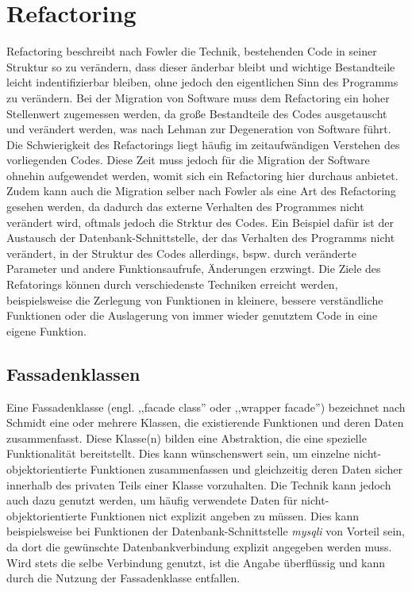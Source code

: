 \section{Refactoring} %
    Refactoring beschreibt nach Fowler die Technik, bestehenden Code in seiner Struktur so zu verändern, dass dieser änderbar bleibt und wichtige Bestandteile leicht indentifizierbar 
    bleiben, ohne jedoch den eigentlichen Sinn des Programms zu verändern. \cite{fowler_refactoring_1999} Bei der Migration von Software muss dem Refactoring ein hoher Stellenwert zugemessen werden, 
    da große Bestandteile des Codes ausgetauscht und verändert werden, was nach Lehman \cite[S. 1060-1076]{lehman_programs_1980} zur Degeneration von Software führt.
    Die Schwierigkeit des Refactorings liegt häufig im zeitaufwändigen Verstehen des vorliegenden Codes. Diese Zeit muss jedoch für die Migration der Software ohnehin 
    aufgewendet werden, womit sich ein Refactoring hier durchaus anbietet. Zudem kann auch die Migration selber nach Fowler als eine 
    Art des Refactoring gesehen werden, da dadurch das externe Verhalten des Programmes nicht verändert wird, oftmals jedoch 
    die Strktur des Codes. Ein Beispiel dafür ist der Austausch der Datenbank-Schnittstelle, der das Verhalten des Programms 
    nicht verändert, in der Struktur des Codes allerdings, bspw. durch veränderte Parameter und andere Funktionsaufrufe, 
    Änderungen erzwingt.
    Die Ziele des Refatorings können durch verschiedenste Techniken erreicht werden, beispielsweise die Zerlegung von Funktionen in kleinere, bessere verständliche 
    Funktionen oder die Auslagerung von immer wieder genutztem Code in eine eigene Funktion.
    \subsection{Fassadenklassen}\label{facade}
    Eine Fassadenklasse (engl. ,,facade class'' oder ,,wrapper facade'') bezeichnet nach Schmidt eine oder mehrere Klassen, die 
    existierende Funktionen und deren Daten zusammenfasst. Diese Klasse(n) bilden eine Abstraktion, die eine spezielle 
    Funktionalität bereitstellt. \cite[S. 54]{schmidt_pattern-oriented_2000} 
    Dies kann wünschenswert sein, um einzelne nicht-objektorientierte Funktionen zusammenfassen und gleichzeitig deren Daten 
    sicher innerhalb des privaten Teils einer Klasse vorzuhalten. Die Technik kann jedoch auch dazu genutzt werden, um häufig 
    verwendete Daten für nicht-objektorientierte Funktionen nict explizit angeben zu müssen. Dies kann beispielsweise 
    bei Funktionen der Datenbank-Schnittstelle \textit{mysqli} von Vorteil sein, da dort die gewünschte Datenbankverbindung 
    explizit angegeben werden muss. Wird stets die selbe Verbindung genutzt, ist die Angabe überflüssig und kann durch die 
    Nutzung der Fassadenklasse entfallen. 
